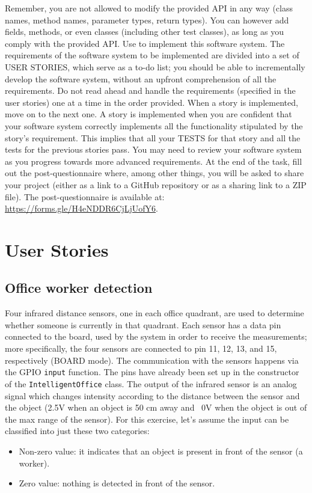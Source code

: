 Remember, you are not allowed to modify the provided API in any way (\ie class names, method names, parameter types, return types). You can however add fields, methods, or even classes (including other test classes), as long as you comply with the provided API. Use \tdd to implement this software system.
The requirements of the software system to be implemented are divided into a set of USER STORIES, which serve as a to-do list; you should be able to incrementally develop the software system, without an upfront comprehension of all the requirements. Do not read ahead and handle the requirements (\ie specified in the user stories) one at a time in the order provided.
When a story is implemented, move on to the next one. A story is implemented when you are confident that your software system correctly implements all the functionality stipulated by the story's requirement. This implies that all your TESTS for that story and all the tests for the previous stories pass. You may need to review your software system as you progress towards more advanced requirements.
At the end of the task, fill out the post-questionnaire where, among other things, you will be asked to share your project (either as a link to a GitHub repository or as a sharing link to a ZIP file). The post-questionnaire is available at: \url{https://forms.gle/H4eNDDR6CjLjUofY6}.


\section{User Stories}
\subsection{Office worker detection}
Four infrared distance sensors, one in each office quadrant, are used to determine whether someone is currently in that quadrant.
Each sensor has a data pin connected to the board, used by the system in order to receive the measurements; more specifically, the four sensors are connected to pin 11, 12, 13, and 15, respectively (BOARD mode).
The communication with the sensors happens via the GPIO \texttt{input} function. The pins have already been set up in the constructor of the \texttt{IntelligentOffice} class. 
The output of the infrared sensor is an analog signal which changes intensity according to the distance between the sensor and the object (\ie 2.5V when an object is 50 cm away and ~0V when the object is out of the max range of the sensor). For this exercise, let's assume the input can be classified into just these two categories:
\begin{itemize}
    \item Non-zero value: it indicates that an object is present in front of the sensor (\ie a worker).
    \item Zero value: nothing is detected in front of the sensor.
\end{itemize}

